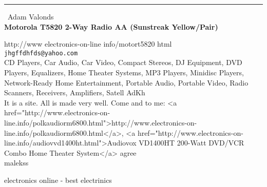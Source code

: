 \documentclass{report}
\begin{document}
\begin{center}
\rule{6in}{1pt} \
{\large Adam Valonds \\
{\bf Motorola T5820 2-Way Radio AA (Sunstreak Yellow/Pair)}}

http://www electronics-on-line info/motort5820 html
\\
{\tt jhgffdhfds@yahoo.com}\\
CD Players, Car Audio, Car Video, Compact Stereos, DJ Equipment, DVD Players, Equalizers, Home Theater Systems, MP3 Players, Minidisc Players, Network-Ready Home Entertainment,  Portable Audio, Portable Video, Radio Scanners, Receivers, Amplifiers, Satell AdKh\\
It is a site. All is made very well. Come and to me: <a href="http://www.electronics-on-line.info/polkaudiorm6800.html">http://www.electronics-on-line.info/polkaudiorm6800.html</a>, <a href="http://www.electronics-on-line.info/audiovvd1400ht.html">Audiovox VD1400HT 200-Watt DVD/VCR Combo Home Theater System</a> agree\\
	malekss\end{center}

electronics online - best electrinics
\end{document}
